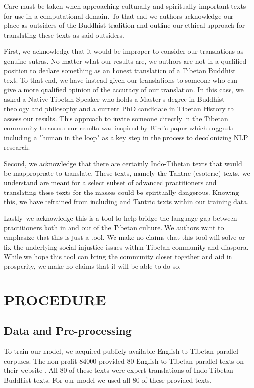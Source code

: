 \documentclass[letterpaper, 10 pt, conference]{ieeeconf}  %
\begin{document}
Care must be taken when approaching culturally and spiritually important texts for use in a computational domain. To that end we authors acknowledge our place as outsiders of the Buddhist tradition and outline our ethical approach for translating these texts as said outsiders.

First, we acknowledge that it would be improper to consider our translations as genuine sutras. No matter what our results are, we authors are not in a qualified position to declare something as an honest translation of a Tibetan Buddhist text. To that end, we have instead given our translations to someone who can give a more qualified opinion of the accuracy of our translation. In this case, we asked a Native Tibetan Speaker who holds a Master's degree in Buddhist theology and philosophy and a current PhD candidate in Tibetan History to  assess our results. This approach to invite someone directly in the Tibetan community to assess our results was inspired by Bird's paper \cite{c7} which suggests including a "human in the loop" as a key step in the process to decolonizing NLP research. 

Second, we acknowledge that there are certainly Indo-Tibetan texts that would be inappropriate to translate. These texts, namely the Tantric (esoteric) texts, we understand are meant for a select subset of advanced practitioners and translating these texts for the masses could be spiritually dangerous. Knowing this, we have refrained from including and Tantric texts within our training data.


Lastly, we acknowledge this is a tool to help bridge the language gap between practitioners both in and out of the Tibetan culture. We authors want to emphasize that this is just a tool. We make no claims that this tool will solve or fix the underlying social injustice issues within Tibetan community and diaspora. While we hope this tool can bring the community closer together and aid in prosperity, we make no claims that it will be able to do so. 

\section{PROCEDURE}



\subsection{Data and Pre-processing}

To train our model, we acquired publicly available English to Tibetan parallel corpuses. The non-profit 84000 provided 80 English to Tibetan parallel texts on their website \cite{c8}. All 80 of these texts were expert translations of Indo-Tibetan Buddhist texts. For our model we used all 80 of these provided texts.
\end{document}
